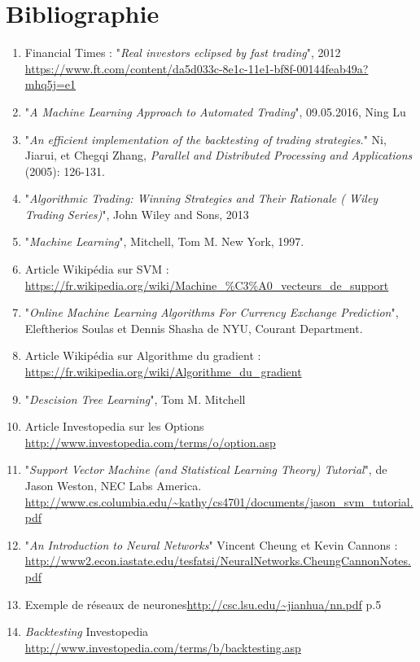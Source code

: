 \documentclass[a4paper, 11pt]{article}
\begin{document}
\section{Bibliographie}

\begin{enumerate}
\item Financial Times : "\textit{Real investors eclipsed by fast trading}", 2012 \url{https://www.ft.com/content/da5d033c-8e1c-11e1-bf8f-00144feab49a?mhq5j=e1} \label{real investors}
\item "\textit{A Machine Learning Approach to Automated Trading}", 09.05.2016, Ning Lu
\item "\textit{An efficient implementation of the backtesting of trading strategies.}" Ni, Jiarui, et Chegqi Zhang, \textit{Parallel and Distributed Processing and Applications} (2005): 126-131.
\item "\textit{Algorithmic Trading: Winning Strategies and Their Rationale ( Wiley Trading Series)}", John Wiley and Sons, 2013
\item "\textit{Machine Learning}", Mitchell, Tom M. New York, 1997.
\item Article Wikipédia sur SVM : \url{https://fr.wikipedia.org/wiki/Machine_\%C3\%A0_vecteurs_de_support} \label{wikipedia svm}
\item "\textit{Online Machine Learning Algorithms For Currency Exchange Prediction}", Eleftherios Soulas et Dennis Shasha de NYU, Courant Department. \label{descente du gradient stochastique}
\item  Article Wikipédia sur Algorithme du gradient : \url{https://fr.wikipedia.org/wiki/Algorithme_du_gradient} \label{wikipedia descente du gradient}
\item "\textit{Descision Tree Learning}", Tom M. Mitchell
\item Article Investopedia sur les Options \url{http://www.investopedia.com/terms/o/option.asp}
\item "\textit{Support Vector Machine (and Statistical Learning Theory) Tutorial}", de Jason Weston, NEC Labs America. \url{http://www.cs.columbia.edu/~kathy/cs4701/documents/jason_svm_tutorial.pdf}
\item  "\textit{An Introduction to Neural Networks}" Vincent Cheung et Kevin Cannons : \url{http://www2.econ.iastate.edu/tesfatsi/NeuralNetworks.CheungCannonNotes.pdf}
\item Exemple de réseaux de neurones\url{http://csc.lsu.edu/~jianhua/nn.pdf} p.5
\item \textit{Backtesting} Investopedia \url{http://www.investopedia.com/terms/b/backtesting.asp} \label{backtesting investopedia}
\end{enumerate}
\end{document}
